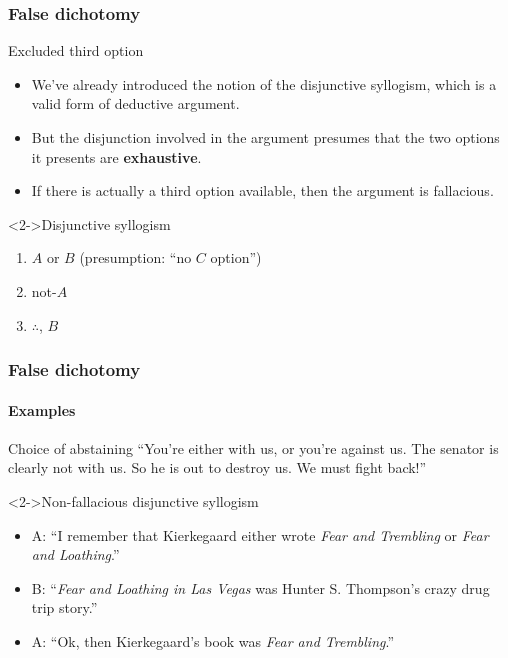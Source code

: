 \documentclass[10pt,letterpaper,xcolor=dvipsnames]{beamer}
\begin{document}
\begin{frame}
  \frametitle{False dichotomy}
  
  \begin{block}{Excluded third option}
    \begin{itemize}
      \item We've already introduced the notion of the disjunctive syllogism, which is a valid form of deductive argument.
      \item But the disjunction involved in the argument presumes that the two options it presents are \textbf{exhaustive}.
      \item If there is actually a third option available, then the argument is fallacious.
    \end{itemize}
  \end{block}
  
  \begin{block}<2->{Disjunctive syllogism}
    \begin{enumerate}
      \item $A$ or $B$ (presumption: ``no $C$ option'')
      \item not-$A$
      \item $\therefore$, $B$
    \end{enumerate}
  \end{block}
  
\end{frame}

\begin{frame}
  \frametitle{False dichotomy}
  \framesubtitle{Examples}
  
  \begin{block}{Choice of abstaining}
    ``You're either with us, or you're against us. The senator is clearly not with us.  So he is out to destroy us.  We must fight back!''
  \end{block}
  
  \begin{block}<2->{Non-fallacious disjunctive syllogism}
    \begin{itemize}
      \item A: ``I remember that Kierkegaard either wrote \textit{Fear and Trembling} or \textit{Fear and Loathing}.''
      \item B: ``\textit{Fear and Loathing in Las Vegas} was Hunter S. Thompson's crazy drug trip story.''
      \item A: ``Ok, then Kierkegaard's book was \textit{Fear and Trembling}.''
    \end{itemize}
  \end{block}
  
\end{frame}
\end{document}
